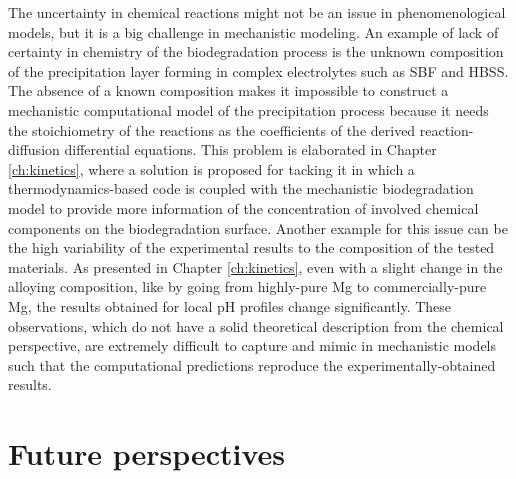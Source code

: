 The uncertainty in chemical reactions might not be an issue in phenomenological models, but it is a big challenge in mechanistic modeling. An example of lack of certainty in chemistry of the biodegradation process is the unknown composition of the precipitation layer forming in complex electrolytes such as SBF and HBSS. The absence of a known composition makes it impossible to construct a mechanistic computational model of the precipitation process because it needs the stoichiometry of the reactions as the coefficients of the derived reaction-diffusion differential equations. This problem is elaborated in Chapter \ref{ch:kinetics}, where a solution is proposed for tacking it in which a thermodynamics-based code is coupled with the mechanistic biodegradation model to provide more information of the concentration of involved chemical components on the biodegradation surface. Another example for this issue can be the high variability of the experimental results to the composition of the tested materials. As presented in Chapter \ref{ch:kinetics}, even with a slight change in the alloying composition, like by going from highly-pure Mg to commercially-pure Mg, the results obtained for local pH profiles change significantly. These observations, which do not have a solid theoretical description from the chemical perspective, are extremely difficult to capture and mimic in mechanistic models such that the computational predictions reproduce the experimentally-obtained results. 




\section{Future perspectives}



\cleardoublepage

